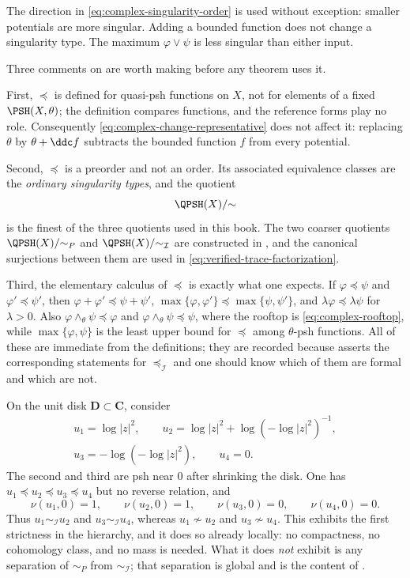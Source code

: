 The direction in \eqref{eq:complex-singularity-order} is used without
exception: smaller potentials are more singular.  Adding a bounded
function does not change a singularity type.  The maximum
\(\varphi\vee\psi\) is less singular than either input.

Three comments on  are worth making
before any theorem uses it.

First, \(\preceq\) is defined for quasi-psh functions on \(X\), not for
elements of a fixed \(\PSH(X,\theta)\); the definition compares functions,
and the reference forms play no role.  Consequently
\eqref{eq:complex-change-representative} does not affect it: replacing
\(\theta\) by \(\theta+\ddc f\) subtracts the bounded function \(f\) from
every potential.

Second, \(\preceq\) is a preorder and not an order.  Its associated
equivalence classes are the \emph{ordinary singularity types}, and the
quotient
\[
 \QPSH(X)/{\sim}
\]
is the finest of the three quotients used in this book.  The two coarser
quotients \(\QPSH(X)/{\sim_P}\) and \(\QPSH(X)/{\sim_{\mathcal I}}\) are
constructed in , and the
canonical surjections between them are used in
\eqref{eq:verified-trace-factorization}.

Third, the elementary calculus of \(\preceq\) is exactly what one expects.
If \(\varphi\preceq\psi\) and \(\varphi'\preceq\psi'\), then
\(\varphi+\varphi'\preceq\psi+\psi'\),
\(\max\{\varphi,\varphi'\}\preceq\max\{\psi,\psi'\}\), and
\(\lambda\varphi\preceq\lambda\psi\) for \(\lambda>0\).  Also
\(\varphi\wedge_\theta\psi\preceq\varphi\) and
\(\varphi\wedge_\theta\psi\preceq\psi\), where the rooftop is
\eqref{eq:complex-rooftop}, while
\(\max\{\varphi,\psi\}\) is the least upper bound for \(\preceq\) among
\(\theta\)-psh functions.  All of these are immediate from the
definitions; they are recorded because
 asserts the corresponding
statements for \(\preceq_{\mathcal I}\) and one should know which of them
are formal and which are not.

\begin{example}
\label{ex:ch51-disk-three-types}
On the unit disk \(\mathbf D\subset\mathbf C\), consider
\[
 \begin{gathered}
 u_1=\log|z|^2,
 \qquad
 u_2=\log|z|^2+\log(-\log|z|^2)^{-1},\\
 u_3=-\log(-\log|z|^2),
 \qquad
 u_4=0 .
 \end{gathered}
\]
The second and third are psh near \(0\) after shrinking the disk.  One has
\(u_1\preceq u_2\preceq u_3\preceq u_4\) but no reverse relation, and
\[
 \nu(u_1,0)=1,\qquad
 \nu(u_2,0)=1,\qquad
 \nu(u_3,0)=0,\qquad
 \nu(u_4,0)=0 .
\]
Thus \(u_1\sim_{\mathcal I}u_2\) and \(u_3\sim_{\mathcal I}u_4\), whereas
\(u_1\not\sim u_2\) and \(u_3\not\sim u_4\).  This exhibits the first
strictness in the hierarchy, and it does so already locally: no
compactness, no cohomology class, and no mass is needed.  What it does
\emph{not} exhibit is any separation of \(\sim_P\) from
\(\sim_{\mathcal I}\); that separation is global and is the content of
.
\end{example}


